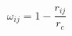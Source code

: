 \documentclass[12pt]{article}
\begin{document}
$$
 \omega_{ij} = 1 - \frac{r_{ij}}{r_{c}}
$$
\end{document}

